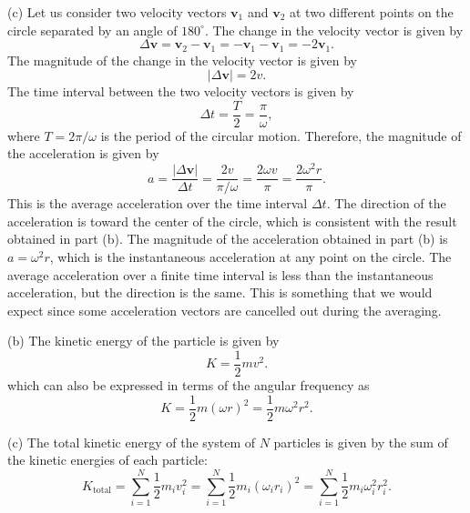 \documentclass[../main.tex]{subfiles}
\begin{document}
(c) Let us consider two velocity vectors $\mathbf{v}_1$ and $\mathbf{v}_2$ at two different points on the circle separated by an angle of $180^\circ$. The change in the velocity vector is given by
\begin{equation}
    \Delta \mathbf{v} = \mathbf{v}_2 - \mathbf{v}_1 = -\mathbf{v}_1 - \mathbf{v}_1 = -2\mathbf{v}_1.
\end{equation}
The magnitude of the change in the velocity vector is given by
\begin{equation}
    |\Delta \mathbf{v}| = 2v.
\end{equation} The time interval between the two velocity vectors is given by
\begin{equation}
    \Delta t = \frac{T}{2} = \frac{\pi}{\omega},
\end{equation}
where $T = 2\pi/\omega$ is the period of the circular motion. Therefore, the magnitude of the acceleration is given by
\begin{equation}
    a = \frac{|\Delta \mathbf{v}|}{\Delta t} = \frac{2v}{\pi/\omega} = \frac{2\omega v}{\pi} = \frac{2\omega^2 r}{\pi}.
\end{equation}
This is the average acceleration over the time interval $\Delta t$. The direction of the acceleration is toward the center of the circle, which is consistent with the result obtained in part (b). The magnitude of the acceleration obtained in part (b) is $a = \omega^2 r$, which is the instantaneous acceleration at any point on the circle. The average acceleration over a finite time interval is less than the instantaneous acceleration, but the direction is the same. This is something that we would expect since some acceleration vectors are cancelled out during the averaging.

(b) The kinetic energy of the particle is given by
\begin{equation}
    K = \frac{1}{2} m v^2.
\end{equation}
which can also be expressed in terms of the angular frequency as
\begin{equation}
    K = \frac{1}{2} m (\omega r)^2 = \frac{1}{2} m \omega^2 r^2.
\end{equation}

(c) The total kinetic energy of the system of $N$ particles is given by the sum of the kinetic energies of each particle:
\begin{equation}
    K_{\text{total}} = \sum_{i=1}^{N} \frac{1}{2} m_i v_i^2 = \sum_{i=1}^{N} \frac{1}{2} m_i (\omega_i r_i)^2 = \sum_{i=1}^{N} \frac{1}{2} m_i \omega_i^2 r_i^2.
\end{equation}
\end{document}
